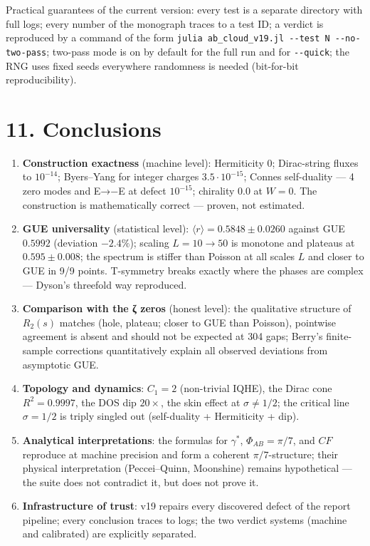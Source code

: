 \documentclass[
]{article}
\providecommand{\tightlist}{%
  \setlength{\itemsep}{0pt}\setlength{\parskip}{0pt}}
\begin{document}
Practical guarantees of the current version: every test is a separate
directory with full logs; every number of the monograph traces to a test
ID; a verdict is reproduced by a command of the form
\texttt{julia\ ab\_cloud\_v19.jl\ -\/-test\ N\ -\/-no-two-pass};
two-pass mode is on by default for the full run and for
\texttt{-\/-quick}; the RNG uses fixed seeds everywhere randomness is
needed (bit-for-bit reproducibility).

\section{11. Conclusions}\label{conclusions}

\begin{enumerate}
\def\labelenumi{\arabic{enumi}.}
\tightlist
\item
  \textbf{Construction exactness} (machine level): Hermiticity 0;
  Dirac-string fluxes to \(10^{-14}\); Byers--Yang for integer charges
  \(3.5\cdot10^{-15}\); Connes self-duality --- 4 zero modes and E→−E at
  defect \(10^{-15}\); chirality \(0.0\) at \(W=0\). The construction is
  mathematically correct --- proven, not estimated.
\item
  \textbf{GUE universality} (statistical level):
  \(\langle r\rangle = 0.5848\pm0.0260\) against GUE \(0.5992\)
  (deviation \(-2.4\%\)); scaling \(L=10\to50\) is monotone and plateaus
  at \(0.595\pm0.008\); the spectrum is stiffer than Poisson at all
  scales \(L\) and closer to GUE in 9/9 points. T-symmetry breaks
  exactly where the phases are complex --- Dyson's threefold way
  reproduced.
\item
  \textbf{Comparison with the ζ zeros} (honest level): the qualitative
  structure of \(R_2(s)\) matches (hole, plateau; closer to GUE than
  Poisson), pointwise agreement is absent and should not be expected at
  304 gaps; Berry's finite-sample corrections quantitatively explain all
  observed deviations from asymptotic GUE.
\item
  \textbf{Topology and dynamics}: \(C_1=2\) (non-trivial IQHE), the
  Dirac cone \(R^2=0.9997\), the DOS dip \(20\times\), the skin effect
  at \(\sigma\neq1/2\); the critical line \(\sigma=1/2\) is triply
  singled out (self-duality + Hermiticity + dip).
\item
  \textbf{Analytical interpretations}: the formulas for
  \(\gamma^{\ast}\), \(\Phi_{AB}=\pi/7\), and \(CF\) reproduce at
  machine precision and form a coherent \(\pi/7\)-structure; their
  physical interpretation (Peccei--Quinn, Moonshine) remains
  hypothetical --- the suite does not contradict it, but does not prove
  it.
\item
  \textbf{Infrastructure of trust}: v19 repairs every discovered defect
  of the report pipeline; every conclusion traces to logs; the two
  verdict systems (machine and calibrated) are explicitly separated.
\end{enumerate}
\end{document}
